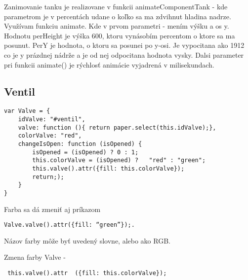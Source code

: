 Zanimovanie tanku je realizovane v funkcii animateComponentTank - kde parametrom je v percentách udane o koľko sa ma zdvihnut hladina nadrze. 
Využívam funkciu animate. Kde v prvom parametri - mením výšku a os y. Hodnotu perHeight je výška 600, ktoru vynásobím percentom o ktore sa ma posunut. PerY je hodnota, o ktoru sa posunei po y-osi. Je vypocitana ako 1912 co je y prázdnej nádrže a je od nej odpocitana hodnota vysky. 
Dalsi parameter pri funkcii animate() je rýchlosť animácie vyjadrená v milisekundach. 

\subsection{Ventil}

\begin{lstlisting}
var Valve = {
	idValve: "#ventil",
	valve: function (){ return paper.select(this.idValve);},
	colorValve: "red",
	changeIsOpen: function (isOpened) {
		isOpened = (isOpened) ? 0 : 1;
		this.colorValve = (isOpened) ?   "red" : "green";
		this.valve().attr({fill: this.colorValve});
		return;);
	}
}
\end{lstlisting}

Farba sa dá zmeniť aj príkazom 

\begin{verbatim}
Valve.valve().attr({fill: “green”});.
\end{verbatim}

Názov farby môže byť uvedený slovne, alebo ako RGB. 

Zmena farby Valve - \begin{verbatim} this.valve().attr  ({fill: this.colorValve}); \end{verbatim}


